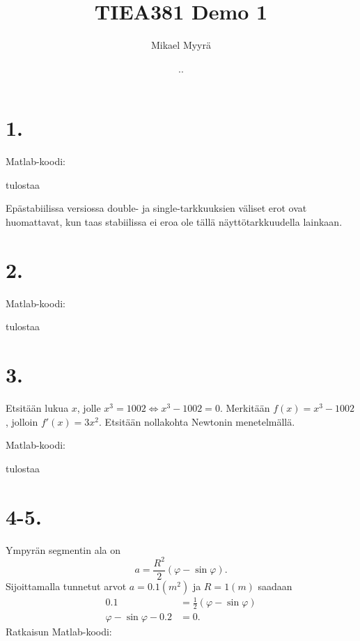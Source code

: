 \documentclass{article}
\title{TIEA381 Demo 1}
\author{Mikael Myyrä}
\date{\number\day.\number\month.\number\year}
\begin{document}
\maketitle

\section*{1.}

Matlab-koodi:



tulostaa



Epästabiilissa versiossa double- ja single-tarkkuuksien väliset erot ovat
huomattavat, kun taas stabii\-lissa ei eroa ole tällä näyttötarkkuudella lainkaan.


\section*{2.}

Matlab-koodi:



tulostaa




\section*{3.}

Etsitään lukua $x$, jolle $x^3 = 1002 \iff x^3 - 1002 = 0$.
Merkitään $f(x) = x^3 - 1002$, jolloin $f'(x) = 3x^2$.
Etsitään nollakohta Newtonin menetelmällä.

Matlab-koodi:



tulostaa



\section*{4-5.}

Ympyrän segmentin ala on
\[
  a = \frac{R^2}{2}(\varphi - \sin \varphi).
\]
Sijoittamalla tunnetut arvot $a = 0.1 (m^2)$ ja $R = 1 (m)$ saadaan
\begin{align*}
  0.1 &= \frac{1}{2}(\varphi - \sin \varphi) \\
  \varphi - \sin \varphi - 0.2 &= 0.
\end{align*}
Ratkaisun Matlab-koodi:
\end{document}
